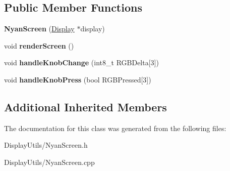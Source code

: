 \subsection*{Public Member Functions}
\begin{DoxyCompactItemize}
\item 
{\bfseries Nyan\+Screen} (\hyperlink{classDisplay}{Display} $\ast$display)\hypertarget{classNyanScreen_acd188f631e8e0ce657b31b94a1fcaed0}{}\label{classNyanScreen_acd188f631e8e0ce657b31b94a1fcaed0}

\item 
void {\bfseries render\+Screen} ()\hypertarget{classNyanScreen_aae9641b13b885eab16ae3bc9e91dee36}{}\label{classNyanScreen_aae9641b13b885eab16ae3bc9e91dee36}

\item 
void {\bfseries handle\+Knob\+Change} (int8\+\_\+t R\+G\+B\+Delta\mbox{[}3\mbox{]})\hypertarget{classNyanScreen_a7fc740bda8f8a3147565433264f4bb4f}{}\label{classNyanScreen_a7fc740bda8f8a3147565433264f4bb4f}

\item 
void {\bfseries handle\+Knob\+Press} (bool R\+G\+B\+Pressed\mbox{[}3\mbox{]})\hypertarget{classNyanScreen_a5c59bde088c7e56a616c99cd51f6ab82}{}\label{classNyanScreen_a5c59bde088c7e56a616c99cd51f6ab82}

\end{DoxyCompactItemize}
\subsection*{Additional Inherited Members}


The documentation for this class was generated from the following files\+:\begin{DoxyCompactItemize}
\item 
Display\+Utils/Nyan\+Screen.\+h\item 
Display\+Utils/Nyan\+Screen.\+cpp\end{DoxyCompactItemize}
